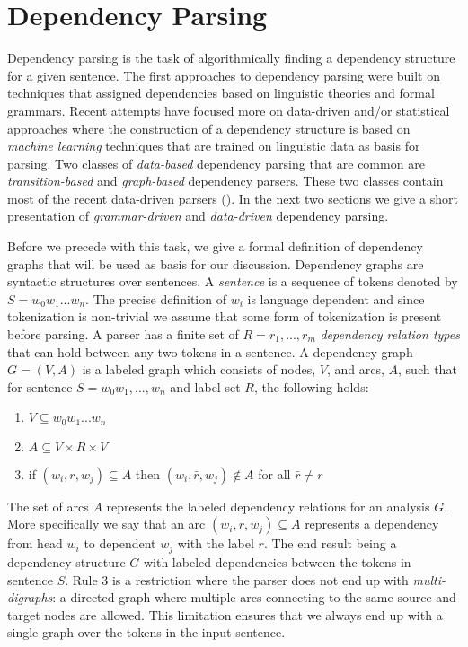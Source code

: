 \documentclass[10pt]{article}
\begin{document}
\section{Dependency Parsing}
Dependency parsing is the task of algorithmically finding a dependency structure for a given sentence. The first approaches to dependency parsing were built on techniques that assigned dependencies based on linguistic theories and formal grammars. Recent attempts have focused more on data-driven and/or statistical approaches where the construction of a dependency structure is based on \textit{machine learning} techniques that are trained on linguistic data as basis for parsing. Two classes of \textit{data-based} dependency parsing that are common are \textit{transition-based} and \textit{graph-based} dependency parsers. These two classes contain most of the recent data-driven parsers (\cite{kubler-sandra-mcdonald-ryan-nivre-book}). In the next two sections we give a short presentation of \textit{grammar-driven} and \textit{data-driven} dependency parsing.

Before we precede with this task, we give a formal definition of dependency graphs that will be used as basis for our discussion. Dependency graphs are syntactic structures over sentences. A \textit{sentence} is a sequence of tokens denoted by $S = w_0w_1 ... w_n$. The precise definition of $w_i$ is language dependent and since tokenization is non-trivial we assume that some form of tokenization is present before parsing. A parser has a finite set of $R = {r_1, ... ,r_m} $ \textit{dependency relation types} that can hold between any two tokens in a sentence. A dependency graph $G = (V, A)$ is a labeled graph which consists of nodes, $V$, and arcs, $A$, such that for sentence $S = w_0w_1, ..., w_n$ and label set $R$, the following holds:

\begin{enumerate}
\item $V \subseteq {w_0w_1 ... w_n}$
\item $A \subseteq V \times R \times V$
\item if $(w_i, r, w_j) \subseteq A$ then $(w_i, \bar{r}, w_j) \not \in A$ for all $\bar{r} \neq r$
\end{enumerate}

The set of arcs $A$ represents the labeled dependency relations for an analysis $G$. More specifically we say that an arc $(w_i, r, w_j) \subseteq A$ represents a dependency from head $w_i$ to dependent $w_j$ with the label $r$. The end result being a dependency structure $G$ with labeled dependencies between the tokens in sentence $S$. Rule 3 is a restriction where the parser does not end up with \textit{multi-digraphs}: a directed graph where multiple arcs connecting to the same source and target nodes are allowed. This limitation ensures that we always end up with a single graph over the tokens in the input sentence.
\end{document}
